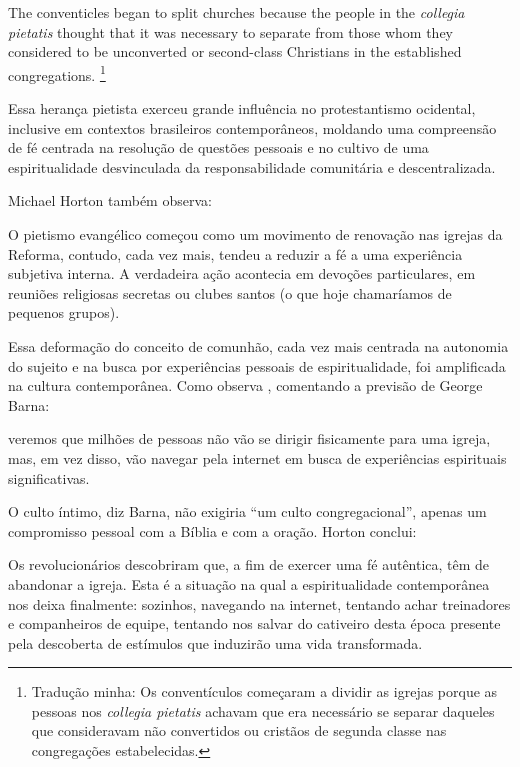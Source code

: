 \begin{citacao}
    The conventicles began to split churches because the people in the \textit{collegia pietatis} thought that it was necessary to separate from those whom they considered to be unconverted or second-class Christians in the established congregations. \cite[p.~4]{brenner_pietism}\footnote{Tradução minha: Os conventículos começaram a dividir as igrejas porque as pessoas nos \textit{collegia pietatis} achavam que era necessário se separar daqueles que consideravam não convertidos ou cristãos de segunda classe nas congregações estabelecidas.}
\end{citacao}

Essa herança pietista exerceu grande influência no protestantismo ocidental, inclusive em contextos brasileiros contemporâneos, moldando uma compreensão de fé centrada na resolução de questões pessoais e no cultivo de uma espiritualidade desvinculada da responsabilidade comunitária e descentralizada.

Michael Horton também observa:

\begin{citacao}
    O pietismo evangélico começou como um movimento de renovação nas igrejas da Reforma, contudo, cada vez mais, tendeu a reduzir a fé a uma experiência subjetiva interna. A verdadeira ação acontecia em devoções particulares, em reuniões religiosas secretas ou clubes santos (o que hoje chamaríamos de pequenos grupos). \cite[p.~178]{horton2010}
\end{citacao}

Essa deformação do conceito de comunhão, cada vez mais centrada na autonomia do sujeito e na busca por experiências pessoais de espiritualidade, foi amplificada na cultura contemporânea. Como observa , comentando a previsão de George Barna:

\begin{citacao}
    veremos que milhões de pessoas não vão se dirigir fisicamente para uma igreja, mas, em vez disso, vão navegar pela internet em busca de experiências espirituais significativas. \cite[p.~164]{horton2010}
\end{citacao}

O culto íntimo, diz Barna, não exigiria ``um culto congregacional'', apenas um compromisso pessoal com a Bíblia e com a oração. Horton conclui:

\begin{citacao}
    Os revolucionários descobriram que, a fim de exercer uma fé autêntica, têm de abandonar a igreja. Esta é a situação na qual a espiritualidade contemporânea nos deixa finalmente: sozinhos, navegando na internet, tentando achar treinadores e companheiros de equipe, tentando nos salvar do cativeiro desta época presente pela descoberta de estímulos que induzirão uma vida transformada. \cite[p.~164]{horton2010}
\end{citacao}

